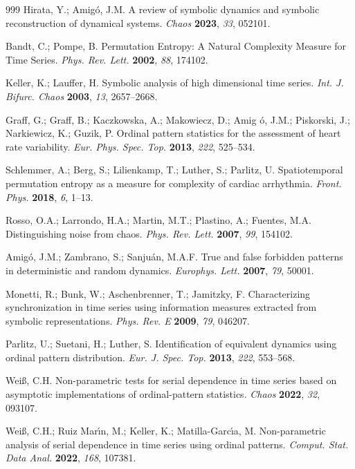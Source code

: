 \documentclass{article}
\begin{document}
\begin{thebibliography}{999}
 Hirata, Y.; Amig\'{o}, J.M. A review of symbolic
dynamics and symbolic reconstruction of dynamical systems. \emph{Chaos} \textbf{2023}, \emph{33}, 052101.

 Bandt, C.; Pompe, B. Permutation Entropy: A Natural
Complexity Measure for Time Series. \emph{Phys. Rev. Lett.} \textbf{2002}, \emph{88}, 174102.

 Keller, K.; Lauffer, H. Symbolic analysis of high
dimensional time series. \emph{Int. J. Bifurc. Chaos} \textbf{2003}, \emph{13}, 2657--2668.

 Graff, G.; Graff, B.; Kaczkowska, A.; Makowiecz, D.; Amig%
\'{o}, J.M.; Piskorski, J.; Narkiewicz, K.; Guzik, P. Ordinal pattern
statistics for the assessment of heart rate variability. \emph{Eur. Phys. Spec. Top.} \textbf{2013}, \emph{222}, 525--534.

 Schlemmer, A.; Berg, S.; Lilienkamp, T.; Luther, S.;
Parlitz, U. Spatiotemporal permutation entropy as a measure for complexity
of cardiac arrhythmia. \emph{Front. Phys.} \textbf{2018}, \emph{6}, 1--13.

 Rosso, O.A.; Larrondo, H.A.; Martin, M.T.; Plastino, A.;
Fuentes, M.A. Distinguishing noise from chaos. \emph{Phys. Rev. Lett.} \textbf{2007}, \emph{99}, 154102.

 Amig\'{o}, J.M.; Zambrano, S.; Sanju\'{a}n, M.A.F. True
and false forbidden patterns in deterministic and random dynamics.
\emph{Europhys. Lett.} \textbf{2007}, \emph{79}, 50001.

 Monetti, R.; Bunk, W.; Aschenbrenner, T.; Jamitzky, F.
Characterizing synchronization in time series using information measures
extracted from symbolic representations. \emph{Phys. Rev. E} \textbf{2009}, \emph{79}, 046207.

 Parlitz, U.; Suetani, H.; Luther, S. Identification of
equivalent dynamics using ordinal pattern distribution. \emph{ Eur. J. Spec. Top.} \textbf{2013}, \emph{222}, 553--568.

 Wei\ss , C.H. Non-parametric tests for serial dependence
in time series based on asymptotic implementations of ordinal-pattern
statistics. \emph{Chaos} \textbf{2022}, \emph{32}, 093107.

 Wei\ss , C.H.; Ruiz Mar\'{\i}n, M.; Keller, K.;
Matilla-Garc\'{\i}a, M. Non-parametric analysis of serial dependence in time
series using ordinal patterns. \emph{Comput. Stat. Data Anal.} \textbf{2022}, \emph{168}, 107381.


\end{thebibliography}
\end{document}
